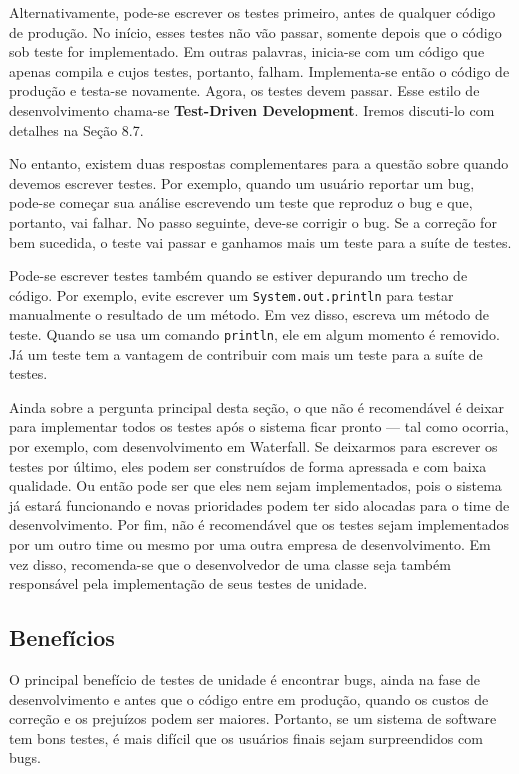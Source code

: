 \documentclass[
  11pt,
  twoside]{book}
\newcommand{\passthrough}[1]{#1}
\begin{document}
Alternativamente, pode-se escrever os testes primeiro, antes de qualquer
código de produção. No início, esses testes não vão passar, somente
depois que o código sob teste for implementado. Em outras palavras,
inicia-se com um código que apenas compila e cujos testes, portanto,
falham. Implementa-se então o código de produção e testa-se novamente.
Agora, os testes devem passar. Esse estilo de desenvolvimento chama-se
\textbf{Test-Driven Development}. Iremos discuti-lo com detalhes na
Seção 8.7.

No entanto, existem duas respostas complementares para a questão sobre
quando devemos escrever testes. Por exemplo, quando um usuário reportar
um bug, pode-se começar sua análise escrevendo um teste que reproduz o
bug e que, portanto, vai falhar. No passo seguinte, deve-se corrigir o
bug. Se a correção for bem sucedida, o teste vai passar e ganhamos mais
um teste para a suíte de testes.

Pode-se escrever testes também quando se estiver depurando um trecho de
código. Por exemplo, evite escrever um
\passthrough{\lstinline!System.out.println!} para testar manualmente o
resultado de um método. Em vez disso, escreva um método de teste. Quando
se usa um comando \passthrough{\lstinline!println!}, ele em algum
momento é removido. Já um teste tem a vantagem de contribuir com mais um
teste para a suíte de testes.

Ainda sobre a pergunta principal desta seção, o que não é recomendável é
deixar para implementar todos os testes após o sistema ficar pronto ---
tal como ocorria, por exemplo, com desenvolvimento em Waterfall. Se
deixarmos para escrever os testes por último, eles podem ser construídos
de forma apressada e com baixa qualidade. Ou então pode ser que eles nem
sejam implementados, pois o sistema já estará funcionando e novas
prioridades podem ter sido alocadas para o time de desenvolvimento. Por
fim, não é recomendável que os testes sejam implementados por um outro
time ou mesmo por uma outra empresa de desenvolvimento. Em vez disso,
recomenda-se que o desenvolvedor de uma classe seja também responsável
pela implementação de seus testes de unidade.

\hypertarget{benefuxedcios}{%
\subsection{Benefícios}\label{benefuxedcios}}


O principal benefício de testes de unidade é encontrar bugs, ainda na
fase de desenvolvimento e antes que o código entre em produção, quando
os custos de correção e os prejuízos podem ser maiores. Portanto, se um
sistema de software tem bons testes, é mais difícil que os usuários
finais sejam surpreendidos com bugs.
\end{document}
